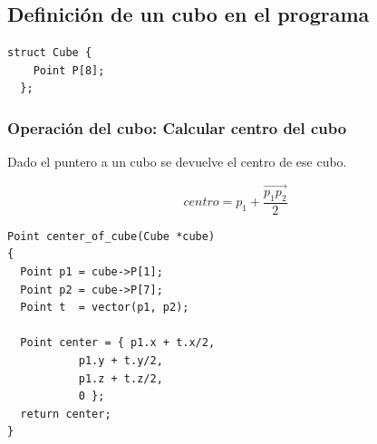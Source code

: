 \documentclass{article}
\begin{document}
\subsection{Definición de un cubo en el programa}
\begin{lstlisting}[frame=single]
  struct Cube {
    Point P[8];
  };
\end{lstlisting}
\subsubsection{Operación del cubo: Calcular centro del cubo}
Dado el puntero a un cubo se devuelve el centro de ese cubo.

\begin{equation}
  centro = p_1 + \frac{\overrightarrow{p_1p_2}}{2}
\end{equation}

\begin{lstlisting}[frame=single]
Point center_of_cube(Cube *cube)
{
  Point p1 = cube->P[1];
  Point p2 = cube->P[7];
  Point t  = vector(p1, p2);

  Point center = { p1.x + t.x/2,
		   p1.y + t.y/2,
		   p1.z + t.z/2,
		   0 };
  return center;
}
\end{lstlisting}

\newpage
\end{document}
